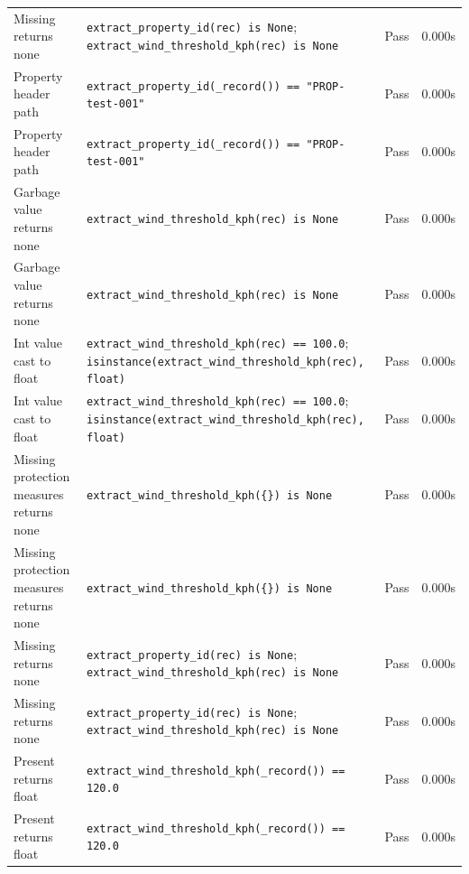 \documentclass[11pt,a4paper]{article}
\begin{document}
\begin{longtable}{p{6cm}p{5.5cm}cc}
    Missing returns none & {\scriptsize \texttt{extract\_property\_id(rec) is None}; \texttt{extract\_wind\_threshold\_kph(rec) is None}} & \textcolor{green!60!black}{Pass} & 0.000s \\
    Property header path & {\scriptsize \texttt{extract\_property\_id(\_record()) == "PROP-test-001"}} & \textcolor{green!60!black}{Pass} & 0.000s \\
    Property header path & {\scriptsize \texttt{extract\_property\_id(\_record()) == "PROP-test-001"}} & \textcolor{green!60!black}{Pass} & 0.000s \\
    Garbage value returns none & {\scriptsize \texttt{extract\_wind\_threshold\_kph(rec) is None}} & \textcolor{green!60!black}{Pass} & 0.000s \\
    Garbage value returns none & {\scriptsize \texttt{extract\_wind\_threshold\_kph(rec) is None}} & \textcolor{green!60!black}{Pass} & 0.000s \\
    Int value cast to float & {\scriptsize \texttt{extract\_wind\_threshold\_kph(rec) == 100.0}; \texttt{isinstance(extract\_wind\_threshold\_kph(rec), float)}} & \textcolor{green!60!black}{Pass} & 0.000s \\
    Int value cast to float & {\scriptsize \texttt{extract\_wind\_threshold\_kph(rec) == 100.0}; \texttt{isinstance(extract\_wind\_threshold\_kph(rec), float)}} & \textcolor{green!60!black}{Pass} & 0.000s \\
    Missing protection measures returns none & {\scriptsize \texttt{extract\_wind\_threshold\_kph(\{\}) is None}} & \textcolor{green!60!black}{Pass} & 0.000s \\
    Missing protection measures returns none & {\scriptsize \texttt{extract\_wind\_threshold\_kph(\{\}) is None}} & \textcolor{green!60!black}{Pass} & 0.000s \\
    Missing returns none & {\scriptsize \texttt{extract\_property\_id(rec) is None}; \texttt{extract\_wind\_threshold\_kph(rec) is None}} & \textcolor{green!60!black}{Pass} & 0.000s \\
    Missing returns none & {\scriptsize \texttt{extract\_property\_id(rec) is None}; \texttt{extract\_wind\_threshold\_kph(rec) is None}} & \textcolor{green!60!black}{Pass} & 0.000s \\
    Present returns float & {\scriptsize \texttt{extract\_wind\_threshold\_kph(\_record()) == 120.0}} & \textcolor{green!60!black}{Pass} & 0.000s \\
    Present returns float & {\scriptsize \texttt{extract\_wind\_threshold\_kph(\_record()) == 120.0}} & \textcolor{green!60!black}{Pass} & 0.000s \\

\end{longtable}
\end{document}
